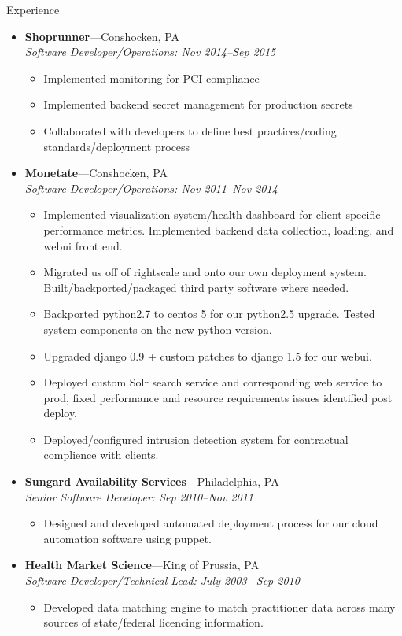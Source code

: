 \documentclass[11pt,oneside]{article}
\newenvironment{ressection}[1]{
        \vspace{4pt}
        {\fontfamily{phv}\selectfont\Large#1}
        \begin{itemize}
        \vspace{3pt}
}{
        \end{itemize}
}
\newcommand{\ressubitem}[1]{
        \vspace{-1pt}
        \item \begin{flushleft} #1 \end{flushleft}
}
\newcommand{\resbigitem}[3]{
        \vspace{-5pt}
        \item
        \textbf{#1}---#2 \\
        \textit{#3}
}
\newenvironment{ressubsec}[3]{
        \resbigitem{#1}{#2}{#3}
        \vspace{-2pt}
        \begin{itemize}
}{
        \end{itemize}
}
\begin{document}
\begin{ressection}{Experience}
        \begin{ressubsec}{Shoprunner}{Conshocken, PA}{Software Developer/Operations: Nov 2014--Sep 2015}

          \ressubitem{Implemented monitoring for PCI compliance }
          \ressubitem{Implemented backend secret management for production secrets }
          \ressubitem{Collaborated with developers to define best practices/coding standards/deployment process}

        \end{ressubsec}
        

        
        \begin{ressubsec}{Monetate}{Conshocken, PA}{Software Developer/Operations: Nov 2011--Nov 2014}

          \ressubitem{Implemented visualization system/health dashboard for client specific performance metrics. Implemented backend data collection, loading, and webui front end. }
          \ressubitem{Migrated us off of rightscale and onto our own deployment system. Built/backported/packaged third party software where needed. }
          \ressubitem{Backported python2.7 to centos 5 for our python2.5 upgrade. Tested system components on the new python version.}
          \ressubitem{Upgraded django 0.9 + custom patches to django 1.5 for our webui.}
          \ressubitem{Deployed custom Solr search service and corresponding web service to prod, fixed performance and resource requirements issues identified post deploy.}
          \ressubitem{Deployed/configured intrusion detection system for contractual complience with clients. }
        \end{ressubsec}


        \begin{ressubsec}{Sungard Availability Services}{Philadelphia, PA}{Senior Software Developer: Sep 2010--Nov 2011}

          \ressubitem{Designed and developed automated deployment process for our cloud automation software using puppet. }
        \end{ressubsec}

        \begin{ressubsec}{Health Market Science}{King of Prussia, PA}{Software Developer/Technical Lead: July 2003-- Sep 2010}

          \ressubitem{Developed data matching engine to match practitioner data across many sources of state/federal licencing information.}


\end{ressubsec}
\end{ressection}
\end{document}
